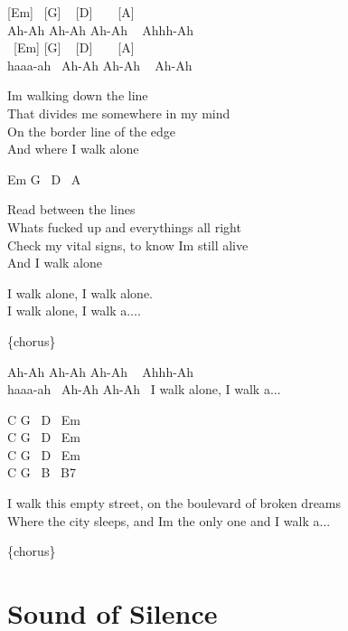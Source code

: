 \documentclass[
  letterpaper,
]{scrbook}
\begin{document}
{[}Em{]} ~{[}G{]} ~ {[}D{]} ~ ~ {[}A{]}\\
Ah-Ah Ah-Ah Ah-Ah ~ Ahhh-Ah\\
\hspace*{0.333em} ~{[}Em{]} {[}G{]} ~ {[}D{]} ~ ~ {[}A{]}\\
haaa-ah ~Ah-Ah Ah-Ah ~ Ah-Ah

I\textquotesingle m walking down the line\\
That divides me somewhere in my mind\\
On the border line of the edge\\
And where I walk alone

Em G ~D ~A

Read between the lines\\
What\textquotesingle s fucked up and everything\textquotesingle s all
right\\
Check my vital signs, to know I\textquotesingle m still alive\\
And I walk alone

I walk alone, I walk alone.\\
I walk alone, I walk a....

\{chorus\}

Ah-Ah Ah-Ah Ah-Ah ~ Ahhh-Ah\\
haaa-ah ~Ah-Ah Ah-Ah ~I walk alone, I walk a...

C G ~D ~Em\\
C G ~D ~Em\\
C G ~D ~Em\\
C G ~B ~B7

I walk this empty street, on the boulevard of broken dreams\\
Where the city sleeps, and I\textquotesingle m the only one and I walk
a...

\{chorus\}

\hypertarget{sound-of-silence}{%
\chapter{Sound of Silence}\label{sound-of-silence}}
\end{document}
